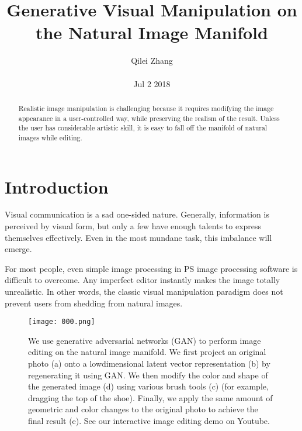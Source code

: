 \documentclass[30pt,twocolumn,letterpaper]{article}
\author{Qilei Zhang\\\\
Jul 2 2018}
\title{Generative Visual Manipulation on the Natural Image Manifold}
\begin{document}
\maketitle
\begin{abstract}
  Realistic image manipulation is challenging because it requires modifying the image appearance in a user-controlled way, while preserving the realism of the result. Unless the user has considerable artistic skill, it is easy to fall off the manifold of natural images while editing.
\end{abstract}
\section{Introduction}
Visual communication is a sad one-sided nature. Generally, information is perceived by visual form, but only a few have enough talents to express themselves effectively. Even in the most mundane task, this imbalance will emerge\cite{Groen2012Low}. \\
\par
For most people, even simple image processing in PS image processing software is difficult to overcome. Any imperfect editor instantly makes the image totally unrealistic. In other words, the classic visual manipulation paradigm does not prevent users from shedding from natural images\cite{Nikolaidis2012Generative}.
\begin{figure}[htbp]
\small
\centering
\texttt{[image: 000.png]}
\caption{We use generative adversarial networks (GAN) to perform image editing
on the natural image manifold. We first project an original photo (a) onto a lowdimensional
latent vector representation (b) by regenerating it using GAN. We then
modify the color and shape of the generated image (d) using various brush tools (c)
(for example, dragging the top of the shoe). Finally, we apply the same amount of
geometric and color changes to the original photo to achieve the final result (e). See
our interactive image editing demo on Youtube.}
\label{fig:lable}
\end{figure}\\
\end{document}

